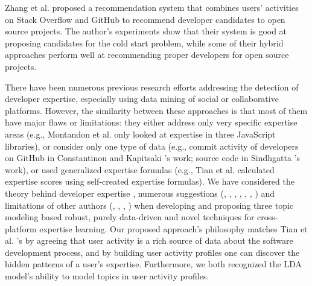         Zhang et al. \cite{zhang2017devrec} proposed a recommendation system that combines users’ activities on Stack Overflow and GitHub to recommend developer candidates to open source projects. The author's experiments show that their system is good at proposing candidates for the cold start problem, while some of their hybrid approaches perform well at recommending proper developers for open source projects.
        
        There have been numerous previous research efforts addressing the detection of developer expertise, especially using data mining of social or collaborative platforms. However, the similarity between these approaches is that most of them have major flaws or limitations: they either address only very specific expertise areas (e.g., Montandon et al. \cite{montandon2019identifying} only looked at expertise in three JavaScript libraries), or consider only one type of data (e.g., commit activity of developers on GitHub in Constantinou and Kapitsaki \cite{constantinou2016identifying}'s work; source code in Sindhgatta \cite{sindhgatta2008identifying}'s work), or used generalized expertise formulas (e.g., Tian et al. \cite{tian2019geek} calculated expertise scores using self-created expertise formulas). We have considered the theory behind developer expertise \cite{baltes2018towards}, numerous suggestions (\cite{wang2018survey}, \cite{tian2013predicting}, \cite{teyton2013find}, \cite{surian2011recommending}, \cite{greene2016cvexplorer}, \cite{liao2017devrank}, \cite{badashian2016crowdsourced}) and limitations of other authors (\cite{montandon2019identifying}, \cite{constantinou2016identifying}, \cite{sindhgatta2008identifying}, \cite{tian2019geek}) when developing and proposing three topic modeling based robust, purely data-driven and novel techniques for cross-platform expertise learning. Our proposed approach's philosophy matches Tian et al. \cite{tian2013predicting}'s by agreeing that user activity is a rich source of data about the software development process, and by building user activity profiles one can discover the hidden patterns of a user's expertise. Furthermore, we both recognized the LDA model's ability to model topics in user activity profiles. 